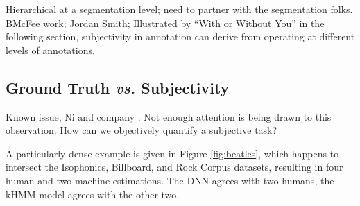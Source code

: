 \documentclass{article}
\begin{document}
Hierarchical at a segmentation level; need to partner with the segmentation folks.
BMcFee work; Jordan Smith;
Illustrated by ``With or Without You'' in the following section, subjectivity in annotation can derive from operating at different levels of annotations.


\subsection{Ground Truth \emph{vs.} Subjectivity}

Known issue, Ni and company \cite{Ni2013Understanding}.
Not enough attention is being drawn to this observation.
How can we objectively quantify a subjective task?


A particularly dense example is given in Figure \ref{fig:beatles}, which happens to intersect the Isophonics, Billboard, and Rock Corpus datasets, resulting in four human and two machine estimations.
The DNN agrees with two humans, the kHMM model agrees with the other two.
\end{document}
